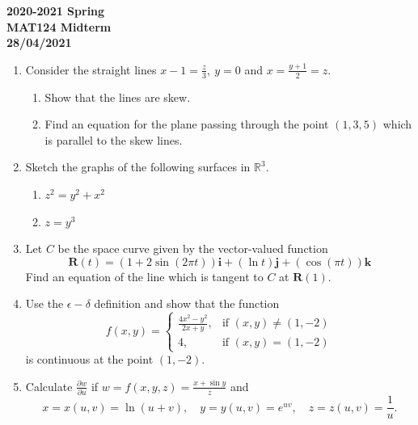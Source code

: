 \documentclass[a4paper, 12pt]{article}
\begin{document}
\newpage
{}
{}
\begin{center}
\textbf{2020-2021 Spring \\MAT124 Midterm\\28/04/2021}
\end{center}

\begin{enumerate}[leftmargin=*,label=\textbf{\arabic*.}]
\item Consider the straight lines $\displaystyle x-1=\frac z3,\: y=0$ and $\displaystyle x=\frac{y+1}2=z$.

\begin{enumerate}[leftmargin=*,label=\textbf{\alph*.}]
\item Show that the lines are skew.
\item  Find an equation for the plane passing through the point $(1,3,5)$ which is parallel to the skew lines.
\end{enumerate}

\item Sketch the graphs of the following surfaces in $\mathbb{R}^3$.

\begin{enumerate}[leftmargin=*,label=\textbf{\alph*.}]
\item $z^2=y^2+x^2$
\item $z=y^3$
\end{enumerate}

\item Let $C$ be the space curve given by the vector-valued function
\[\mathbf{R}(t)=(1+2\sin(2\pi t))\mathbf{i}+(\ln t)\mathbf{j}+(\cos(\pi t))\mathbf{k}\]
Find an equation of the line which is tangent to $C$ at $\mathbf{R}(1)$.

\item Use the $\epsilon-\delta$ definition and show that the function
\[f(x,y)=\left\{\begin{array}{cl}
\displaystyle\frac{4x^2-y^2}{2x+y},& \text{if }(x,y)\neq(1,-2)\\[1em]
4,&\text{if }(x,y)=(1,-2)
\end{array}\right.\]
is continuous at the point $(1,-2)$.

\item Calculate $\displaystyle\frac{\partial w}{\partial u}$ if $\displaystyle w=f(x,y,z)=\frac{x+\sin y}z$ and
\[x=x(u,v)=\ln(u+v),\quad y=y(u,v)={e}^{uv},\quad z=z(u,v)=\frac1u.\]


\end{enumerate}
\end{document}

